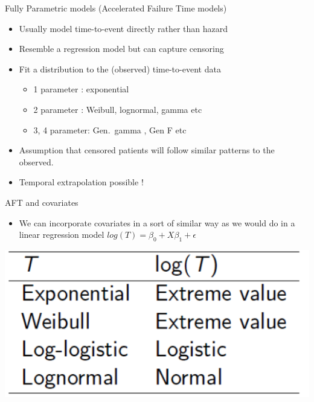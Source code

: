 \documentclass[
  ignorenonframetext,
]{beamer}
\providecommand{\tightlist}{%
  \setlength{\itemsep}{0pt}\setlength{\parskip}{0pt}}
\begin{document}
\begin{frame}{Fully Parametric models (Accelerated Failure Time models)}
\protect\hypertarget{fully-parametric-models-accelerated-failure-time-models}{}

\begin{itemize}
\tightlist
\item
  Usually model time-to-event directly rather than hazard
\item
  Resemble a regression model but can capture censoring
\item
  Fit a distribution to the (observed) time-to-event data

  \begin{itemize}
  \tightlist
  \item
    1 parameter : exponential
  \item
    2 parameter : Weibull, lognormal, gamma etc
  \item
    3, 4 parameter: Gen.~gamma , Gen F etc
  \end{itemize}
\item
  Assumption that censored patients will follow similar patterns to the
  observed.
\item
  Temporal extrapolation possible !
\end{itemize}

\end{frame}

\begin{frame}{AFT and covariates}
\protect\hypertarget{aft-and-covariates}{}

\begin{itemize}
\tightlist
\item
  We can incorporate covariates in a sort of similar way as we would do
  in a linear regression model
  \(log(T) = \beta_0 + X\beta_1 + \epsilon\)
\end{itemize}

\includegraphics[width=1\linewidth]{figures/aft}

\end{frame}
\end{document}
